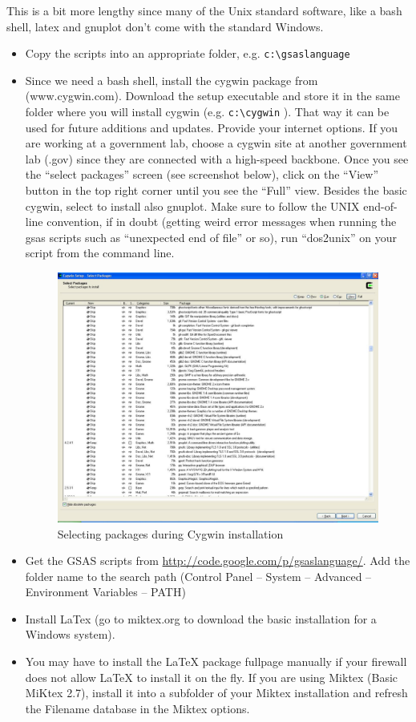 This is a bit more lengthy since many of the Unix standard software, like a bash shell, latex and gnuplot don't come with the standard Windows.
\begin{itemize}
\item Copy the scripts into an appropriate folder, e.g. \texttt{c:\textbackslash gsaslanguage} 
\item Since we need a bash shell, install the cygwin package from (www.cygwin.com).  Download the setup executable and store it in the same folder where you will install cygwin (e.g. \texttt{c:\textbackslash cygwin} ). That way it can be used for future additions and updates. Provide your internet options. If you are working at a government lab, choose a cygwin site at another government lab (.gov) since they are connected with a high-speed backbone. Once you see the ``select packages'' screen (see screenshot below), click on the ``View'' button in the top right corner until you see the ``Full'' view. Besides the basic cygwin, select to install also gnuplot.  Make sure to follow the UNIX end-of-line convention, if in doubt (getting weird error messages when running the gsas scripts such as ``unexpected end of file'' or so), run ``dos2unix'' on your script from the command line.
\begin{figure}[h]
\centering
\includegraphics[width=12cm]{Screenshot1.pdf}
\caption{Selecting packages during Cygwin installation}
\label{fig:Screenshot1}
\end{figure}

\item Get the GSAS scripts from \url{http://code.google.com/p/gsaslanguage/}. Add the folder name to the search path (Control Panel -- System -- Advanced
-- Environment Variables -- PATH)
\item Install LaTex (go to miktex.org to download the basic installation for a Windows system).
\item You may have to install the LaTeX package fullpage manually if your firewall does not allow LaTeX to install it on the fly. If you are using Miktex (Basic MiKtex 2.7), install it into a subfolder of your Miktex installation and refresh the Filename database in the Miktex options.
\end{itemize}


